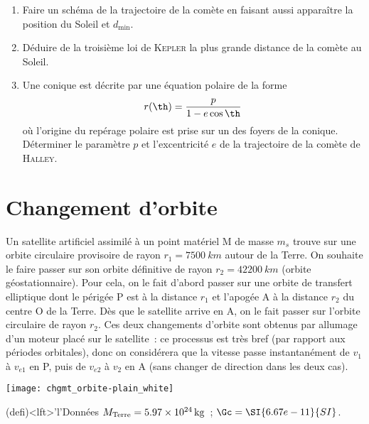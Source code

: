 \documentclass[a4paper, 10pt, final, garamond]{book}
\begin{document}
\begin{enumerate}
	\item Faire un schéma de la trajectoire de la comète en faisant aussi
	      apparaître la position du Soleil et $d_{\min}$.
	\item Déduire de la troisième loi de \textsc{Kepler} la plus grande distance
	      de la comète au Soleil.
	\item Une conique est décrite par une équation polaire de la forme
	      \[r(\th) = \frac{p}{1-e\cos\th}\]
	      où l'origine du repérage polaire est prise sur un des foyers de la
	      conique. Déterminer le paramètre $p$ et l'excentricité $e$ de la
	      trajectoire de la comète de \textsc{Halley}.
\end{enumerate}

\section{Changement d'orbite}

\noindent
\begin{minipage}{0.70\linewidth}
	Un satellite artificiel assimilé à un point matériel M de masse $m_s$ trouve
	sur une orbite circulaire provisoire de rayon $r_1 = \SI{7500}{km}$ autour
	de la Terre. On souhaite le faire passer sur son orbite définitive de rayon
	$r_2 = \SI{42200}{km}$ (orbite géostationnaire). Pour cela, on le fait
	d'abord passer sur une orbite de transfert elliptique dont le périgée P est
	à la distance $r_1$ et l'apogée A à la distance $r_2$ du centre O de la
	Terre. Dès que le satellite arrive en A, on le fait passer sur l'orbite
	circulaire de rayon $r_2$. Ces deux changements d'orbite sont obtenus par
	allumage d'un moteur placé sur le satellite~: ce processus est très bref
	(par rapport aux périodes orbitales), donc on considérera que la vitesse
	passe instantanément de $v_1$ à $v_{e1}$ en P, puis de $v_{e2}$ à $v_2$ en A
	(sans changer de direction dans les deux cas).
\end{minipage}
\hfill
\begin{minipage}{0.25\linewidth}
	\begin{center}
		\texttt{[image: chgmt\_orbite-plain\_white]}
	\end{center}
\end{minipage}
\begin{tcb}(defi)<lft>'l'{Données}
	$M_{\rm Terre} = \SI{5.97e24}{kg}$~; $\Gc = \SI{6.67e-11}{SI}$.
\end{tcb}
\end{document}
